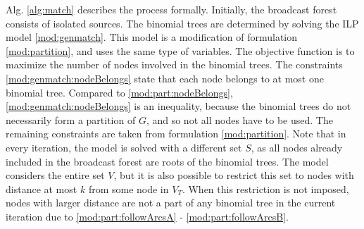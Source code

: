 Alg. \ref{alg:match} describes the process formally.
Initially, the broadcast forest consists of isolated sources.
The binomial trees are determined by solving the ILP model \eqref{mod:genmatch}. 
This model is a modification of formulation \eqref{mod:partition}, and uses the same type of variables.
The objective function is to maximize the number of nodes involved in the binomial trees.
The constraints \eqref{mod:genmatch:nodeBelongs} state that each node belongs to at most one binomial tree.
Compared to \eqref{mod:part:nodeBelongs}, \eqref{mod:genmatch:nodeBelongs} is an inequality, because the binomial trees do not necessarily form a partition of $G$, and so not all nodes have to be used.
The remaining constraints are taken from formulation \eqref{mod:partition}. 
Note that in every iteration, the model is solved with a different set $S$, as all nodes already included in the broadcast forest are roots of the binomial trees.
The model considers the entire set $V$, but it is also possible to restrict this set to nodes with distance at most $k$ from some node in $V_T$.
When this restriction is not imposed, nodes with larger distance are not a part of any binomial tree in the current iteration due to \eqref{mod:part:followArcsA} - \eqref{mod:part:followArcsB}.

